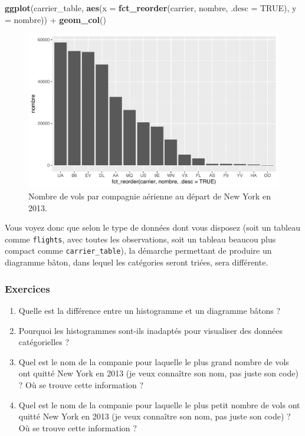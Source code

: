 \documentclass[a4paperpaper,]{article}
\newenvironment{Shaded}{\begin{snugshade}}{\end{snugshade}}
\newcommand{\DataTypeTok}[1]{\textcolor[rgb]{0.00,0.34,0.68}{#1}}
\newcommand{\KeywordTok}[1]{\textcolor[rgb]{0.12,0.11,0.11}{\textbf{#1}}}
\newcommand{\NormalTok}[1]{\textcolor[rgb]{0.12,0.11,0.11}{#1}}
\newcommand{\OperatorTok}[1]{\textcolor[rgb]{0.12,0.11,0.11}{#1}}
\newcommand{\OtherTok}[1]{\textcolor[rgb]{0.00,0.43,0.16}{#1}}
\newcommand{\StringTok}[1]{\textcolor[rgb]{0.75,0.01,0.01}{#1}}
\providecommand{\tightlist}{%
  \setlength{\itemsep}{0pt}\setlength{\parskip}{0pt}}
\theoremstyle{definition}
\theoremstyle{definition}
\theoremstyle{definition}
\theoremstyle{remark}
\begin{document}
\begin{Shaded}
\begin{Highlighting}[]
\KeywordTok{ggplot}\NormalTok{(carrier_table, }\KeywordTok{aes}\NormalTok{(}\DataTypeTok{x =} \KeywordTok{fct_reorder}\NormalTok{(carrier, nombre, }\DataTypeTok{.desc =} \OtherTok{TRUE}\NormalTok{), }\DataTypeTok{y =}\NormalTok{ nombre)) }\OperatorTok{+}
\StringTok{  }\KeywordTok{geom_col}\NormalTok{()}
\end{Highlighting}
\end{Shaded}

\begin{figure}[htpb]

{\centering \includegraphics[width=0.9\linewidth]{figure/bpcarriersortedcol-1} 

}

\caption{Nombre de vols par compagnie aérienne au départ de New York en 2013.}\label{fig:bpcarriersortedcol}
\end{figure}

Vous voyez donc que selon le type de données dont vous disposez (soit un
tableau comme \texttt{flights}, avec toutes les observations, soit un
tableau beaucou plus compact comme \texttt{carrier\_table}), la démarche
permettant de produire un diagramme bâton, dans lequel les catégories
seront triées, sera différente.

\hypertarget{exercices-5}{%
\subsubsection{Exercices}\label{exercices-5}}

\begin{enumerate}
\def\labelenumi{\arabic{enumi}.}
\tightlist
\item
  Quelle est la différence entre un histogramme et un diagramme bâtons ?
\item
  Pourquoi les histogrammes sont-ils inadaptés pour visualiser des
  données catégorielles ?
\item
  Quel est le nom de la companie pour laquelle le plus grand nombre de
  vols ont quitté New York en 2013 (je veux connaître son nom, pas juste
  son code) ? Où se trouve cette information ?
\item
  Quel est le nom de la companie pour laquelle le plus petit nombre de
  vols ont quitté New York en 2013 (je veux connaître son nom, pas juste
  son code) ? Où se trouve cette information ?
\end{enumerate}
\end{document}
